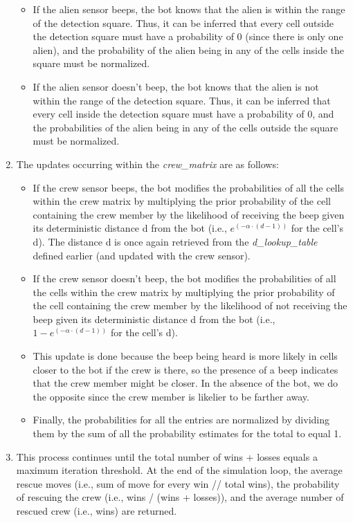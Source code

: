\documentclass[11pt]{article}
\begin{document}
\begin{enumerate}
    \begin{itemize}
        \item If the alien sensor beeps, the bot knows that the alien is within the range of the detection square. Thus, it can be inferred that every cell outside the detection square must have a probability of 0 (since there is only one alien), and the probability of the alien being in any of the cells inside the square must be normalized.
        \item If the alien sensor doesn't beep, the bot knows that the alien is not within the range of the detection square. Thus, it can be inferred that every cell inside the detection square must have a probability of 0, and the probabilities of the alien being in any of the cells outside the square must be normalized.
    \end{itemize}
    \item The updates occurring within the \emph{crew\_matrix} are as follows:
    \begin{itemize}
        \item If the crew sensor beeps, the bot modifies the probabilities of all the cells within the crew matrix by multiplying the prior probability of the cell containing the crew member by the likelihood of receiving the beep given its deterministic distance d from the bot (i.e., $e^{(-\alpha \cdot (d - 1))}$ for the cell's d). The distance d is once again retrieved from the \emph{d\_lookup\_table} defined earlier (and updated with the crew sensor).
        \item If the crew sensor doesn't beep, the bot modifies the probabilities of all the cells within the crew matrix by multiplying the prior probability of the cell containing the crew member by the likelihood of not receiving the beep given its deterministic distance d from the bot (i.e., $1 - e^{(-\alpha \cdot (d - 1))}$ for the cell's d).
        \item This update is done because the beep being heard is more likely in cells closer to the bot if the crew is there, so the presence of a beep indicates that the crew member might be closer. In the absence of the bot, we do the opposite since the crew member is likelier to be farther away.
        \item Finally, the probabilities for all the entries are normalized by dividing them by the sum of all the probability estimates for the total to equal 1.
    \end{itemize}
    \item This process continues until the total number of wins + losses equals a maximum iteration threshold. At the end of the simulation loop, the average rescue moves (i.e., sum of move for every win // total wins), the probability of rescuing the crew (i.e., wins / (wins + losses)), and the average number of rescued crew (i.e., wins) are returned.
\end{enumerate}
\end{document}
